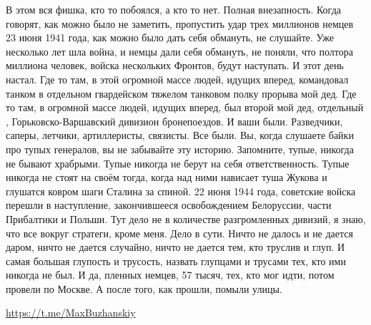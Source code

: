 В этом вся фишка, кто то побоялся, а кто то нет.
Полная внезапность.
Когда говорят, как можно было не заметить, пропустить удар трех миллионов немцев 23 июня 1941 года, как можно было дать себя обмануть, не слушайте.
Уже несколько лет шла война, и немцы дали себя обмануть, не поняли, что полтора миллиона человек, войска нескольких Фронтов, будут наступать.
И этот день настал.
Где то там, в этой огромной массе людей, идущих вперед, командовал танком в отдельном гвардейском тяжелом танковом полку прорыва мой дед.
Где то там, в огромной массе людей, идущих вперед, был второй мой дед, отдельный , Горьковско-Варшавский дивизион бронепоездов.
И ваши были.
Разведчики, саперы, летчики, артиллеристы, связисты.
Все были.
Вы, когда слушаете байки про тупых генералов, вы не забывайте эту историю.
Запомните, тупые, никогда не бывают храбрыми.
Тупые никогда не берут на себя ответственность.
Тупые никогда не стоят на своём тогда, когда над ними нависает туша Жукова и глушатся ковром шаги Сталина за спиной.
22 июня 1944 года, советские войска перешли в наступление, закончившееся освобождением Белоруссии, части Прибалтики и Польши.
Тут дело не в количестве разгромленных дивизий, я знаю, что все вокруг стратеги, кроме меня.
Дело в сути.
Ничто не далось и не дается даром, ничто не дается случайно, ничто не дается тем, кто труслив и глуп.
И самая большая глупость и трусость, назвать глупцами и трусами тех, кто ими никогда не был.
И да, пленных немцев, 57 тысяч, тех, кто мог идти, потом провели по Москве.
А после того, как прошли, помыли улицы.

\url{https://t.me/MaxBuzhanskiy}
